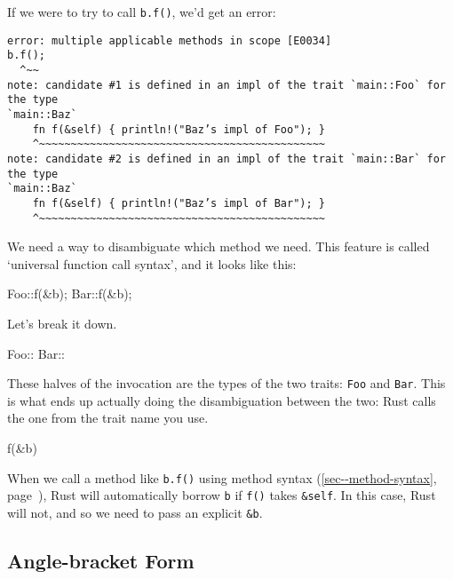 \documentclass[a4paper,]{book}
\renewcommand*{\hyperref}[2][\ar]{%
  \def\ar{#2}%
  #2 (\autoref{#1}, page~\pageref{#1})}
\newenvironment{Shaded}{\begin{snugshade}}{\end{snugshade}}
\newcommand{\NormalTok}[1]{{#1}}
\begin{document}
If we were to try to call \texttt{b.f()}, we'd get an error:

\begin{verbatim}
error: multiple applicable methods in scope [E0034]
b.f();
  ^~~
note: candidate #1 is defined in an impl of the trait `main::Foo` for the type
`main::Baz`
    fn f(&self) { println!("Baz’s impl of Foo"); }
    ^~~~~~~~~~~~~~~~~~~~~~~~~~~~~~~~~~~~~~~~~~~~~~
note: candidate #2 is defined in an impl of the trait `main::Bar` for the type
`main::Baz`
    fn f(&self) { println!("Baz’s impl of Bar"); }
    ^~~~~~~~~~~~~~~~~~~~~~~~~~~~~~~~~~~~~~~~~~~~~~
\end{verbatim}

We need a way to disambiguate which method we need. This feature is
called `universal function call syntax', and it looks like this:

\begin{Shaded}
\begin{Highlighting}[]
\NormalTok{Foo::f(&b);}
\NormalTok{Bar::f(&b);}
\end{Highlighting}
\end{Shaded}

Let's break it down.

\begin{Shaded}
\begin{Highlighting}[]
\NormalTok{Foo::}
\NormalTok{Bar::}
\end{Highlighting}
\end{Shaded}

These halves of the invocation are the types of the two traits:
\texttt{Foo} and \texttt{Bar}. This is what ends up actually doing the
disambiguation between the two: Rust calls the one from the trait name
you use.

\begin{Shaded}
\begin{Highlighting}[]
\NormalTok{f(&b)}
\end{Highlighting}
\end{Shaded}

When we call a method like \texttt{b.f()} using
\hyperref[sec--method-syntax]{method syntax}, Rust will automatically
borrow \texttt{b} if \texttt{f()} takes \texttt{\&self}. In this case,
Rust will not, and so we need to pass an explicit \texttt{\&b}.

\subsection{Angle-bracket Form}\label{angle-bracket-form}
\end{document}
